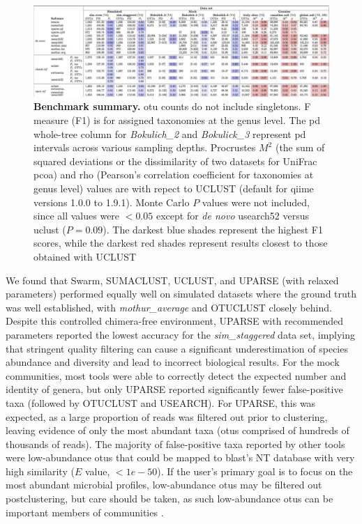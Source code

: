\begin{figure}[htbp]
\includegraphics[width=\columnwidth]{chapter_otupicking_figures/stateArtT2.pdf}
\caption[Benchmark summary]{\textbf{Benchmark summary.} \gls{otu} counts do not
include singletons. F measure (F1) is for assigned taxonomies at the genus level.
The \gls{pd} whole-tree column for \emph{Bokulich\_2} and \emph{Bokulick\_3}
represent \gls{pd} intervals across various sampling depths. Procrustes $M^2$
(the sum of squared deviations or the dissimilarity of two datasets for UniFrac
\gls{pcoa}) and rho (Pearson's correlation coefficient for taxonomies at genus
level) values are with repect to UCLUST (default for \gls{qiime} versions 1.0.0
to 1.9.1). Monte Carlo $P$ values were not included, since all values were
$<0.05$ except for \emph{de novo} usearch52 versus uclust ($P = 0.09$). The darkest
blue shades represent the highest F1 scores, while the darkest red shades represent
results closest to those obtained with UCLUST}
\label{stateArtT2}
\end{figure}

We found that Swarm, SUMACLUST, UCLUST, and UPARSE (with relaxed parameters)
performed equally well on simulated datasets where the ground truth was well
established, with \emph{mothur\_average} and OTUCLUST closely behind. Despite
this controlled chimera-free environment, UPARSE with recommended parameters
reported the lowest accuracy for the \emph{sim\_staggered} data set, implying
that stringent quality filtering can cause a significant underestimation of
species abundance and diversity and lead to incorrect biological results. For
the mock communities, most tools were able to correctly detect the expected
number and identity of genera, but only UPARSE reported significantly fewer
false-positive taxa (followed by OTUCLUST and USEARCH). For UPARSE, this was
expected, as a large proportion of reads was filtered out prior to clustering,
leaving evidence of only the most abundant taxa (\gls{otu}s comprised of
hundreds of thousands of reads). The majority of false-positive taxa reported
by other tools were low-abundance \gls{otu}s that could be mapped to \gls{blast}’s NT
database with very high similarity ($E$ value, $<1e−50$). If the user’s primary
goal is to focus on the most abundant microbial profiles, low-abundance \gls{otu}s
may be filtered out postclustering, but care should be taken, as such low-abundance
\gls{otu}s can be important members of communities \cite{Shade2014}.

